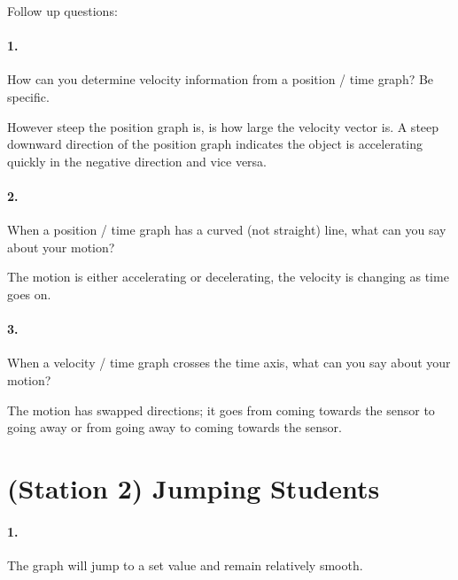     Follow up questions:

    \paragraph*{1.} How can you determine velocity information from a position / time graph? Be specific.

    \begin{mdframed}
        However steep the position graph is, is how large the velocity vector is. A steep downward direction of the position graph indicates the object is accelerating quickly in the negative direction and vice versa.
    \end{mdframed}

    \paragraph*{2.} When a position / time graph has a curved (not straight) line, what can you say about your motion?
    
    \begin{mdframed}
        The motion is either accelerating or decelerating, the velocity is changing as time goes on.
    \end{mdframed}
    
    \paragraph*{3.} When a velocity / time graph crosses the time axis, what can you say about your motion?

    \begin{mdframed}
        The motion has swapped directions; it goes from coming towards the sensor to going away or from going away to coming towards the sensor.
    \end{mdframed}

    \pagebreak

    \section*{(Station 2) Jumping Students}
        \paragraph*{1.}

        \begin{mdframed}
            The graph will jump to a set value and remain relatively smooth.

        \end{mdframed}

